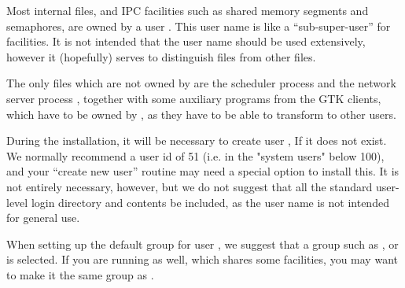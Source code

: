 {Most internal files, and IPC facilities such as shared memory segments and
semaphores, are owned by a user \batchuser. This user name is like a ``sub-super-user''
for \ProductName{} facilities. It is not intended that the \batchuser{} user name should be used
extensively, however it (hopefully) serves to distinguish \ProductName{} files from other
files.

The only files which are not owned by \batchuser{} are the scheduler process 
and the network server process , together with some auxiliary programs
from the GTK clients, which have to be owned by , as they have to be able to
transform to other users.

During the installation, it will be necessary to create user \batchuser{}, If it does not
exist. We normally recommend a user id of 51 (i.e. in the "system users" below 100),
and your ``create new user'' routine may need a special option to install this. It is not
entirely necessary, however, but we do not suggest that all the standard user-level
login directory and contents be included, as the user name is not intended for general
use.

When setting up the default group for user \batchuser{}, we suggest that a group such as
, or  is selected. If you are running \OtherProductName{} as well, which shares some
facilities, you may want to make it the same group as \spooluser.

}
